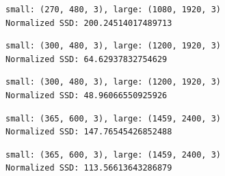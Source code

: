 \documentclass[10pt]{article}
\begin{document}
    \begin{Verbatim}[commandchars=\\\{\}]
small: (270, 480, 3), large: (1080, 1920, 3)
Normalized SSD: 200.24514017489713
    \end{Verbatim}

    \begin{center}
    \end{center}
    
    \begin{Verbatim}[commandchars=\\\{\}]
small: (300, 480, 3), large: (1200, 1920, 3)
Normalized SSD: 64.62937832754629
    \end{Verbatim}

    \begin{center}
    \end{center}
    
    \begin{Verbatim}[commandchars=\\\{\}]
small: (300, 480, 3), large: (1200, 1920, 3)
Normalized SSD: 48.96066550925926
    \end{Verbatim}

    \begin{center}
    \end{center}
    
    \begin{Verbatim}[commandchars=\\\{\}]
small: (365, 600, 3), large: (1459, 2400, 3)
Normalized SSD: 147.76545426852488
    \end{Verbatim}

    \begin{center}
    \end{center}
    
    \begin{Verbatim}[commandchars=\\\{\}]
small: (365, 600, 3), large: (1459, 2400, 3)
Normalized SSD: 113.56613643286879
    \end{Verbatim}

    \begin{center}
    \end{center}
    
\end{document}
